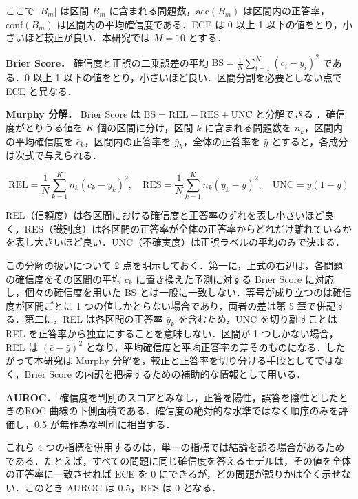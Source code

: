ここで $|B_m|$ は区間 $B_m$ に含まれる問題数，$\mathrm{acc}(B_m)$ は区間内の正答率，$\mathrm{conf}(B_m)$ は区間内の平均確信度である．ECE は 0 以上 1 以下の値をとり，小さいほど較正が良い．本研究では $M = 10$ とする．

\textbf{Brier Score．} 確信度と正誤の二乗誤差の平均 $\mathrm{BS} = \frac{1}{N} \sum_{i=1}^{N} (c_i - y_i)^2$ である．0 以上 1 以下の値をとり，小さいほど良い．区間分割を必要としない点で ECE と異なる．

\textbf{Murphy 分解．} Brier Score は $\mathrm{BS} = \mathrm{REL} - \mathrm{RES} + \mathrm{UNC}$ と分解できる \cite{murphy1973partition}．確信度がとりうる値を $K$ 個の区間に分け，区間 $k$ に含まれる問題数を $n_k$，区間内の平均確信度を $\bar{c}_k$，区間内の正答率を $\bar{y}_k$，全体の正答率を $\bar{y}$ とすると，各成分は次式で与えられる．

\begin{equation}
\mathrm{REL} = \frac{1}{N} \sum_{k=1}^{K} n_k (\bar{c}_k - \bar{y}_k)^2, \quad
\mathrm{RES} = \frac{1}{N} \sum_{k=1}^{K} n_k (\bar{y}_k - \bar{y})^2, \quad
\mathrm{UNC} = \bar{y}(1 - \bar{y})
\end{equation}

REL（信頼度）は各区間における確信度と正答率のずれを表し小さいほど良く，RES（識別度）は各区間の正答率が全体の正答率からどれだけ離れているかを表し大きいほど良い．UNC（不確実度）は正誤ラベルの平均のみで決まる．

この分解の扱いについて 2 点を明示しておく．第一に，上式の右辺は，各問題の確信度をその区間の平均 $\bar{c}_k$ に置き換えた予測に対する Brier Score に対応し，個々の確信度を用いた $\mathrm{BS}$ とは一般に一致しない．等号が成り立つのは確信度が区間ごとに 1 つの値しかとらない場合であり，両者の差は第 5 章で併記する．第二に，REL は各区間の正答率 $\bar{y}_k$ を含むため，UNC を切り離すことは REL を正答率から独立にすることを意味しない．区間が 1 つしかない場合，REL は $(\bar{c} - \bar{y})^2$ となり，平均確信度と平均正答率の差そのものになる．したがって本研究は Murphy 分解を，較正と正答率を切り分ける手段としてではなく，Brier Score の内訳を把握するための補助的な情報として用いる．

\textbf{AUROC．} 確信度を判別のスコアとみなし，正答を陽性，誤答を陰性としたときのROC 曲線の下側面積である．確信度の絶対的な水準ではなく順序のみを評価し，0.5 が無作為な判別に相当する．

これら 4 つの指標を併用するのは，単一の指標では結論を誤る場合があるためである．たとえば，すべての問題に同じ確信度を答えるモデルは，その値を全体の正答率に一致させれば ECE を 0 にできるが，どの問題が誤りかは全く示せない．このとき AUROC は 0.5，RES は 0 となる．

